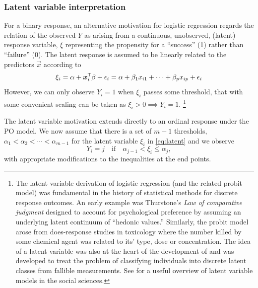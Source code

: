 \documentclass[11pt]{book}\usepackage[]{graphicx}\usepackage[]{color}
\begin{document}
\subsubsection{Latent variable interpretation}
For a binary response, an alternative motivation for logistic regression
regards the relation of the observed $Y$ as arising from a continuous, unobserved,
(latent) response variable, $\xi$ representing the propensity for a
``success'' (1) rather than ``failure'' (0).  
The latent response is assumed to be linearly related to the predictors $\vec{x}$
according to 
\begin{equation}\label{eq:latent}
 \xi_i = \alpha + \bm{x}_i ^\mathsf{T} \beta + \epsilon_i 
        = \alpha + \beta_1 x_{i1} + \cdots + \beta_p x_{ip} + \epsilon_i
\end{equation}
However, we can only observe $Y_i =1$ when $\xi_i$ passes some threshold,
that with some convenient scaling can be taken as
$\xi_i > 0 \implies Y_i=1$.%
\footnote{
The latent variable derivation of logistic regression (and the related probit model)
was fundamental in the history of statistical methods for discrete response outcomes.
An early example was Thurstone's \citeyearpar{Thurstone:27}
\emph{Law of comparative judgment} designed to account for psychological preference
by assuming an underlying latent continuum of ``hedonic values.''
Similarly, the probit model arose from does-response studies in toxicology \citep{Bliss:1934,Finney1947}
where the number killed by some chemical agent was related to its' type, dose or concentration. 
The idea of a latent variable was also at the heart of the
development of  
and  \citep{Lazarsfeld:1950,Lazarsfeld:1954}
was developed to treat the problem of classifying individuals into discrete latent
classes from fallible measurements.
See \citet{Bollen:2002} for a useful overview of latent variable models in the social sciences.
}

The latent variable motivation extends directly to an ordinal response under the PO model. 
We now assume that there is a set of $m-1$ thresholds,
$\alpha_1 < \alpha_2 < \cdots < \alpha_{m-1}$ for the latent variable
$\xi_i$ in \eqref{eq:latent} and we observe
\begin{equation*}
  Y_i = j \quad \mbox{if} \quad \alpha_{j-1} < \xi_i \le \alpha_j \comma
\end{equation*}
with appropriate modifications to the inequalities at the end points.  
\end{document}
